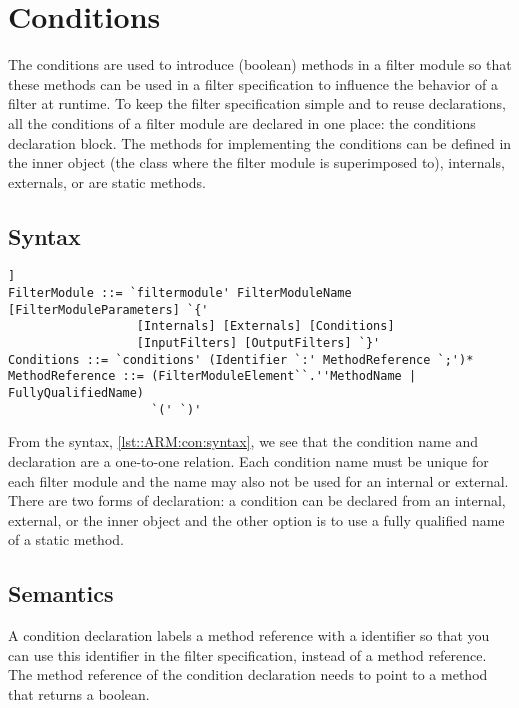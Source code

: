 \chapter{Conditions} \label{ch::arm:con}
The conditions are used to introduce (boolean) methods  in a filter module so that these methods can be used in a filter specification
to influence the behavior of a filter at runtime. To keep the filter specification simple and to reuse declarations, all the conditions of a filter module are declared in one place: the conditions declaration block.
The methods for implementing the conditions can be defined in the inner object (the class where the filter module is superimposed to), internals, externals, or are static methods.

\section*{Syntax}
\begin{lstlisting}[caption={Conditions syntax},label=lst::ARM:con:syntax,style=listing,language=ebnf,float=[tpb]]
FilterModule ::= `filtermodule' FilterModuleName [FilterModuleParameters] `{'
                  [Internals] [Externals] [Conditions]
                  [InputFilters] [OutputFilters] `}'
Conditions ::= `conditions' (Identifier `:' MethodReference `;')*
MethodReference ::= (FilterModuleElement``.''MethodName | FullyQualifiedName)
                    `(' `)'
\end{lstlisting}
From the syntax, \autoref{lst::ARM:con:syntax}, we see that the condition name and declaration are a one-to-one relation. Each condition name must be unique for each filter module and the name may also not be used for an internal or external. There are two forms of declaration: a condition can be declared from
an internal, external, or the inner object and the other option is to use a fully qualified name of a static method.

\section*{Semantics}
A condition declaration labels a method reference with a identifier so that you can use this identifier in the filter specification, instead of a method reference. The method reference of the condition declaration needs to point to a method that returns a boolean.

